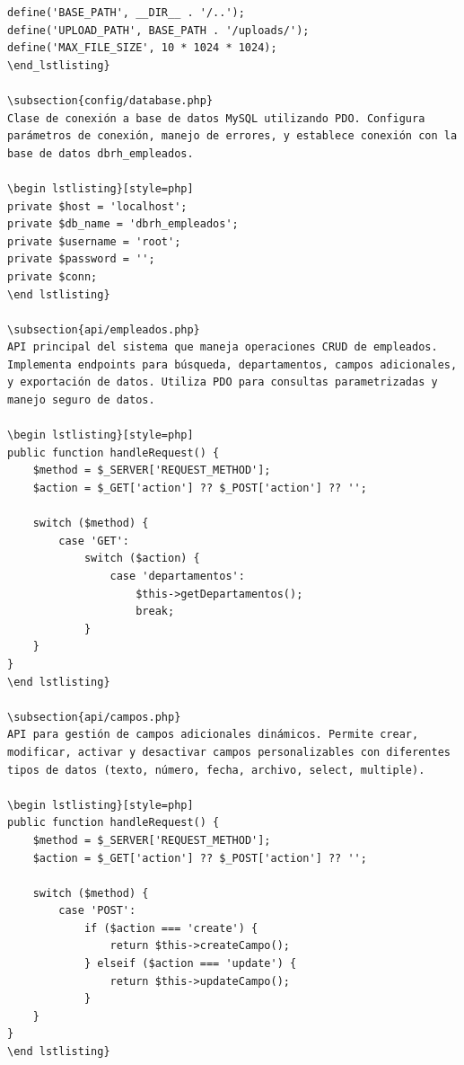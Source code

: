 \documentclass[12pt,a4paper]{article}
\begin{document}
\begin{lstlisting}[style=php]
define('BASE_PATH', __DIR__ . '/..');
define('UPLOAD_PATH', BASE_PATH . '/uploads/');
define('MAX_FILE_SIZE', 10 * 1024 * 1024);
\end_lstlisting}

\subsection{config/database.php}
Clase de conexión a base de datos MySQL utilizando PDO. Configura parámetros de conexión, manejo de errores, y establece conexión con la base de datos dbrh_empleados.

\begin lstlisting}[style=php]
private $host = 'localhost';
private $db_name = 'dbrh_empleados';
private $username = 'root';
private $password = '';
private $conn;
\end lstlisting}

\subsection{api/empleados.php}
API principal del sistema que maneja operaciones CRUD de empleados. Implementa endpoints para búsqueda, departamentos, campos adicionales, y exportación de datos. Utiliza PDO para consultas parametrizadas y manejo seguro de datos.

\begin lstlisting}[style=php]
public function handleRequest() {
    $method = $_SERVER['REQUEST_METHOD'];
    $action = $_GET['action'] ?? $_POST['action'] ?? '';
    
    switch ($method) {
        case 'GET':
            switch ($action) {
                case 'departamentos':
                    $this->getDepartamentos();
                    break;
            }
    }
}
\end lstlisting}

\subsection{api/campos.php}
API para gestión de campos adicionales dinámicos. Permite crear, modificar, activar y desactivar campos personalizables con diferentes tipos de datos (texto, número, fecha, archivo, select, multiple).

\begin lstlisting}[style=php]
public function handleRequest() {
    $method = $_SERVER['REQUEST_METHOD'];
    $action = $_GET['action'] ?? $_POST['action'] ?? '';
    
    switch ($method) {
        case 'POST':
            if ($action === 'create') {
                return $this->createCampo();
            } elseif ($action === 'update') {
                return $this->updateCampo();
            }
    }
}
\end lstlisting}


\end{lstlisting}
\end{document}
